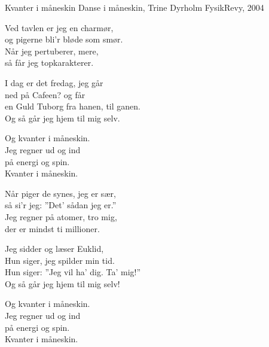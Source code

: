 \begin{song}{Kvanter i måneskin}
  {} %
  {Danse i måneskin, Trine Dyrholm} %
  {} %
  {FysikRevy, 2004} %
  {\NotCCLIed} %

  \begin{SBVerse}
    Ved tavlen er jeg en charmør,\\
    og pigerne bli’r bløde som smør.\\
    Når jeg pertuberer, mere,\\
    så får jeg topkarakterer.
  \end{SBVerse}
  \begin{SBVerse}
    I dag er det fredag, jeg går\\
    ned på Cafeen? og får\\
    en Guld Tuborg fra hanen, til ganen.\\
    Og så går jeg hjem til mig selv.
  \end{SBVerse}

  \begin{SBChorus}
    Og kvanter i måneskin.\\
    Jeg regner ud og ind\\
    på energi og spin.\\
    Kvanter i måneskin.
  \end{SBChorus}

  \begin{SBVerse}
    Når piger de synes, jeg er sær,\\
    så si’r jeg: ”Det’ sådan jeg er.”\\
    Jeg regner på atomer, tro mig,\\
    der er mindst ti millioner.
  \end{SBVerse}
  \begin{SBVerse}
    Jeg sidder og læser Euklid,\\
    Hun siger, jeg spilder min tid.\\
    Hun siger: ”Jeg vil ha’ dig. Ta’ mig!”\\
    Og så går jeg hjem til mig selv!
  \end{SBVerse}

  \begin{SBChorus}
    Og kvanter i måneskin.\\
    Jeg regner ud og ind\\
    på energi og spin.\\
    Kvanter i måneskin.
  \end{SBChorus}
\end{song}